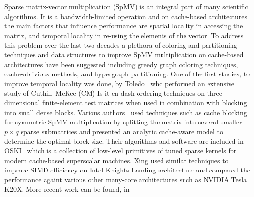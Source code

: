 


Sparse matrix-vector multiplication (SpMV) is an integral part of many scientific algorithms. It is a bandwidth-limited operation and on cache-based architectures the main factors that influence performance are spatial locality in accessing the matrix, and temporal locality in re-using the elements of the vector. To address this problem over the last two decades a plethora of coloring and partitioning techniques and data structures to improve SpMV multiplication on cache-based architectures have been suggested including greedy graph coloring techniques, cache-oblivious methods, and hypergraph partitioning. One of the first studies, \eg to improve temporal locality was done, \eg by Toledo~\cite{Toledo:1997:IMP:279511.279532} who performed an extensive study of Cuthill--McKee (CM) {\CA Is it en dash } ordering techniques on three dimensional finite-element test matrices when used in combination with blocking into small dense blocks. Various authors~\cite{Buluc:2011:RMA:2058524.2059503,Williams:2009:OSM:1513001.1513318,doi:10.1177/1094342004041296} used techniques such as cache blocking for symmetric SpMV multiplication by splitting the matrix into several smaller $p \times q$ sparse submatrices and presented an analytic cache-aware model to determine the optimal block size. Their algorithms and software are included in OSKI~\cite{1742-6596-16-1-071} which is a collection of low-level primitives of tuned sparse kernels for modern cache-based superscalar machines. Xing \etal \cite{Liu:2013:ESM:2464996.2465013} used similar techniques to improve SIMD efficiency on Intel Knights Landing architecture
and compared the performance againt various other many-core architectures such as NVIDIA Tesla K20X. More recent work can be found, \eg in~\cite{Buluc:2011:RMA:2058524.2059503,Liu:2015:CES:2751205.2751209}

